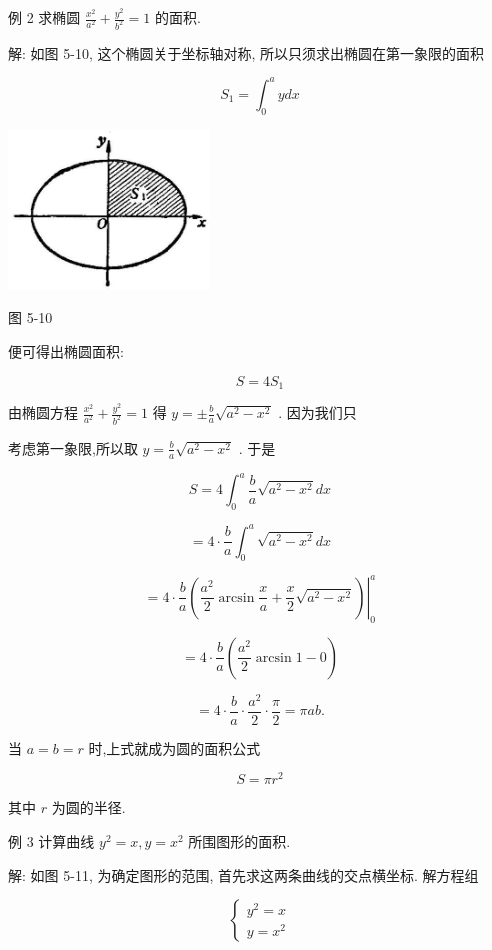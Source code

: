 \documentclass[10pt]{article}
\begin{document}
例 2 求椭圆 \(\frac{{x}^{2}}{{a}^{2}} + \frac{{y}^{2}}{{b}^{2}} = 1\) 的面积.

解: 如图 5-10, 这个椭圆关于坐标轴对称, 所以只须求出椭圆在第一象限的面积

\[
{S}_{1} = {\int }_{0}^{a}{ydx}
\]

\begin{center}
\includegraphics[max width=0.4\textwidth]{images/01912c18-5c3f-733d-b775-749ba9897a9d_233_497776.jpg}
\end{center}

图 5-10

便可得出椭圆面积:

\[
S = 4{S}_{1}
\]

由椭圆方程 \(\frac{{x}^{2}}{{a}^{2}} + \frac{{y}^{2}}{{b}^{2}} = 1\) 得 \(y = \pm \frac{b}{a}\sqrt{{a}^{2} - {x}^{2}}\) . 因为我们只

考虑第一象限,所以取 \(y = \frac{b}{a}\sqrt{{a}^{2} - {x}^{2}}\) . 于是

\[
S = 4{\int }_{0}^{a}\frac{b}{a}\sqrt{{a}^{2} - {x}^{2}}{dx}
\]

\[
= 4 \cdot \frac{b}{a}{\int }_{0}^{a}\sqrt{{a}^{2} - {x}^{2}}{dx}
\]

\[
= {\left. 4 \cdot \frac{b}{a}\left( \frac{{a}^{2}}{2}\arcsin \frac{x}{a} + \frac{x}{2}\sqrt{{a}^{2} - {x}^{2}}\right) \right| }_{0}^{a}
\]

\[
= 4 \cdot \frac{b}{a}\left( {\frac{{a}^{2}}{2}\arcsin 1 - 0}\right)
\]

\[
= 4 \cdot \frac{b}{a} \cdot \frac{{a}^{2}}{2} \cdot \frac{\pi }{2} = {\pi ab}.
\]

当 \(a = b = r\) 时,上式就成为圆的面积公式

\[
S = \pi {r}^{2}
\]

其中 \(r\) 为圆的半径.

例 3 计算曲线 \({y}^{2} = x,y = {x}^{2}\) 所围图形的面积.

解: 如图 5-11, 为确定图形的范围, 首先求这两条曲线的交点横坐标. 解方程组

\[
\left\{ \begin{array}{l} {y}^{2} = x \\ y = {x}^{2} \end{array}\right.
\]
\end{document}
